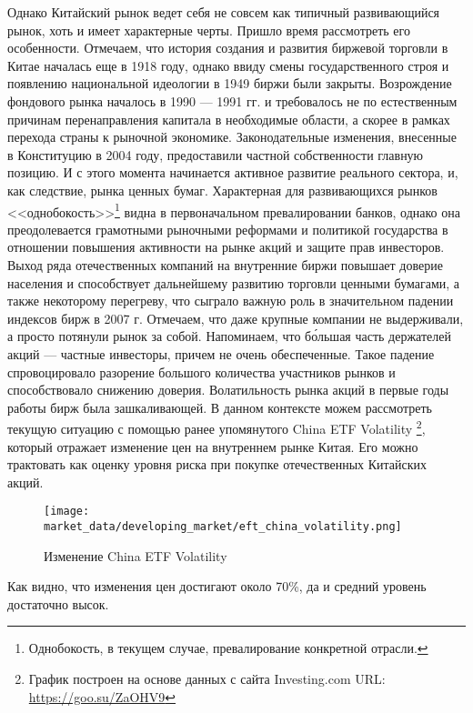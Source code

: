 Однако Китайский рынок ведет себя не совсем как типичный развивающийся рынок, хоть и имеет характерные черты. Пришло время рассмотреть его особенности. Отмечаем, что история создания и развития биржевой торговли в Китае началась еще в 1918 году, однако ввиду смены государственного строя и появлению национальной идеологии в 1949 биржи были закрыты. Возрождение фондового рынка \cite{berger2008fund} началось в 1990 --- 1991 гг. и требовалось не по естественным причинам перенаправления капитала в необходимые области, а скорее в рамках перехода страны к рыночной экономике. Законодательные изменения, внесенные в Конституцию в 2004 году, предоставили частной собственности главную позицию. И с этого момента начинается активное развитие реального сектора, и, как следствие, рынка ценных бумаг. Характерная для развивающихся рынков <<однобокость>>\footnote{Однобокость, в текущем случае, превалирование конкретной отрасли.} видна в первоначальном превалировании банков, однако она преодолевается грамотными рыночными реформами и политикой государства в отношении повышения активности на рынке акций и защите прав инвесторов. Выход ряда отечественных компаний на внутренние биржи повышает доверие населения и способствует дальнейшему развитию торговли ценными бумагами, а также некоторому перегреву, что сыграло важную роль в значительном падении индексов бирж в 2007 г. Отмечаем, что даже крупные компании не выдерживали, а просто потянули рынок за собой. Напоминаем, что б\'{о}льшая часть держателей акций --- частные инвесторы, причем не очень обеспеченные. Такое падение спровоцировало разорение большого количества участников рынков и способствовало снижению доверия. Волатильность рынка акций в первые годы работы бирж была зашкаливающей. В данном контексте можем рассмотреть текущую ситуацию с помощью ранее упомянутого China ETF Volatility \footnote{График построен на основе данных с сайта Investing.com URL: \url{https://goo.su/ZaOHV9}}, который отражает изменение цен на внутреннем рынке Китая. Его можно трактовать как оценку уровня риска при покупке отечественных Китайских акций.

\begin{figure}[H]
	\centering
	\texttt{[image: market\_data/developing\_market/eft\_china\_volatility.png]}
	\caption{Изменение China ETF Volatility}
\end{figure}

\noindent Как видно, что изменения цен достигают около 70\%, да и средний уровень достаточно высок. 

